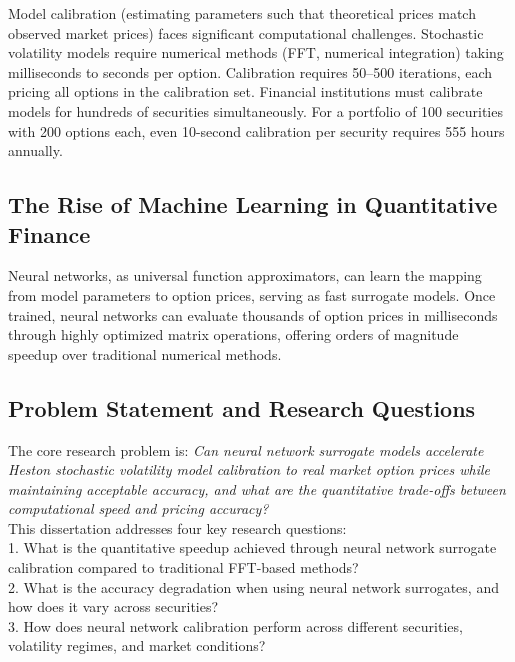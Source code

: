 \documentclass[12pt,a4paper]{article}
\begin{document}
Model calibration (estimating parameters such that theoretical prices match observed market prices) faces significant computational challenges. Stochastic volatility models require numerical methods (FFT, numerical integration) taking milliseconds to seconds per option. Calibration requires 50--500 iterations, each pricing all options in the calibration set. Financial institutions must calibrate models for hundreds of securities simultaneously. For a portfolio of 100 securities with 200 options each, even 10-second calibration per security requires 555 hours annually.\\[0.5cm]

\subsection{The Rise of Machine Learning in Quantitative Finance}

Neural networks, as universal function approximators, can learn the mapping from model parameters to option prices, serving as fast surrogate models. Once trained, neural networks can evaluate thousands of option prices in milliseconds through highly optimized matrix operations, offering orders of magnitude speedup over traditional numerical methods.

\subsection{Problem Statement and Research Questions}

The core research problem is: \textit{Can neural network surrogate models accelerate Heston stochastic volatility model calibration to real market option prices while maintaining acceptable accuracy, and what are the quantitative trade-offs between computational speed and pricing accuracy?}\\[0.05cm]

This dissertation addresses four key research questions:\\[0.05cm]

1. What is the quantitative speedup achieved through neural network surrogate calibration compared to traditional FFT-based methods?\\[0.05cm]

2. What is the accuracy degradation when using neural network surrogates, and how does it vary across securities?\\[0.05cm]

3. How does neural network calibration perform across different securities, volatility regimes, and market conditions?\\[0.05cm]
\end{document}

